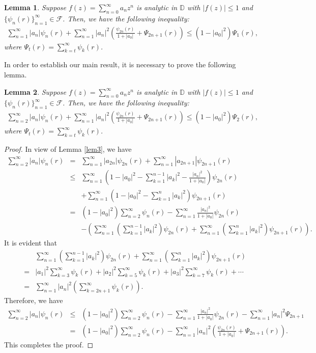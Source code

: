 \documentclass[11pt,reqno]{amsart}
\newtheorem{lem}{Lemma}[section]
\newtheorem{open problem}{Open problem}[section]
\newcommand{\F}{{\mathcal{F}}}
\newcommand{\beas}{\begin{eqnarray*}}
\newcommand{\eeas}{\end{eqnarray*}}
\numberwithin{equation}{section}
\begin{document}
\begin{lem}\cite[Proof of Theorem 1]{PVW2021}\label{lem6} Suppose $f(z)=\sum_{n=0}^\infty a_nz^n$ is analytic in $\mathbb{D}$ with $|f(z)|\leq1$ and $\{\psi_n(r)\}_{n=1}^\infty \in\F$. Then, we have the following inequality:
\beas \sum_{n=1}^\infty |a_n|\psi_n(r)+\sum_{n=1}^\infty |a_n|^2\left(\frac{\psi_{2n}(r)}{1+|a_0|}+\Psi_{2n+1}(r)\right)\leq \left(1-|a_0|^2\right)\Psi_1(r),\eeas
where $\Psi_t(r)=\sum_{k=t}^\infty \psi_k(r)$.
\end{lem}
In order to establish our main result, it is necessary to prove the following lemma.
\begin{lem}\label{lem7} Suppose $f(z)=\sum_{n=0}^\infty a_nz^n$ is analytic in $\mathbb{D}$ with $|f(z)|\leq1$ and $\{\psi_n(r)\}_{n=1}^\infty \in\F$. Then, we have the following inequality:
\beas \sum_{n=2}^\infty |a_n|\psi_n(r)+\sum_{n=1}^\infty |a_n|^2\left(\frac{\psi_{2n}(r)}{1+|a_0|}+\Psi_{2n+1}(r)\right)\leq \left(1-|a_0|^2\right)\Psi_2(r),\eeas
where $\Psi_t(r)=\sum_{k=t}^\infty \psi_k(r)$.
\end{lem}
\begin{proof} In view of \textrm{Lemma \ref{lem3}}, we have
\beas\sum_{n=2}^\infty |a_n|\psi_n(r)&=&\sum_{n=1}^\infty |a_{2n}|\psi_{2n}(r)+\sum_{n=1}^\infty |a_{2n+1}|\psi_{2n+1}(r)\\[2mm]
&\leq &\sum_{n=1}^\infty \left(1-|a_0|^2-\sum_{k=1}^{n-1}|a_k|^2-\frac{|a_n|^2}{1+|a_0|}\right)\psi_{2n}(r)\\[2mm]
&&+\sum_{n=1}^\infty \left(1-|a_0|^2-\sum_{k=1}^{n}|a_k|^2\right)\psi_{2n+1}(r)\\[2mm]
&=&\left(1-|a_0|^2\right)\sum_{n=2}^\infty \psi_n(r)-\sum_{n=1}^\infty\frac{|a_n|^2}{1+|a_0|}\psi_{2n}(r)\\[2mm]
&&-\left(\sum_{n=1}^\infty\left(\sum_{k=1}^{n-1}|a_k|^2\right) \psi_{2n}(r)+\sum_{n=1}^\infty\left(\sum_{k=1}^{n}|a_k|^2\right) \psi_{2n+1}(r)\right).\eeas
It is evident that 
\beas &&\sum_{n=1}^\infty\left(\sum_{k=1}^{n-1}|a_k|^2\right) \psi_{2n}(r)+\sum_{n=1}^\infty\left(\sum_{k=1}^{n}|a_k|^2\right) \psi_{2n+1}(r)\\[2mm]
&=&|a_1|^2\sum_{k=3}^\infty \psi_k(r)+|a_2|^2\sum_{k=5}^\infty \psi_k(r)+|a_3|^2\sum_{k=7}^\infty \psi_k(r)+\cdots\\[2mm]
&=&\sum_{n=1}^\infty |a_n|^2\left(\sum_{k=2n+1}^\infty \psi_k(r)\right).\eeas
Therefore, we have 
\beas \sum_{n=2}^\infty |a_n|\psi_n(r)&\leq&\left(1-|a_0|^2\right)\sum_{n=2}^\infty \psi_n(r)-\sum_{n=1}^\infty\frac{|a_n|^2}{1+|a_0|}\psi_{2n}(r)-\sum_{n=1}^\infty |a_n|^2\Psi_{2n+1}\\[2mm]
&=&\left(1-|a_0|^2\right)\sum_{n=2}^\infty \psi_n(r)-\sum_{n=1}^\infty|a_n|^2\left(\frac{\psi_{2n}(r)}{1+|a_0|}+\Psi_{2n+1}(r)\right).\eeas
This completes the proof.
\end{proof}
\end{document}
